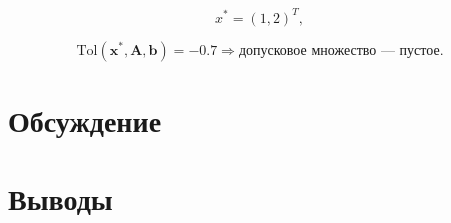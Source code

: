 \documentclass{article}
\begin{document}
\begin{enumerate}
      \[
        x^* = (1, 2)^T,
      \]

      \[
        \text{Tol}(\mathbf{x}^*, \mathbf{A}, \mathbf{b}) = -0.7 \Rightarrow \text{допусковое множество --- пустое}.
      \]
  \end{enumerate}

  \clearpage

  \section{Обсуждение}

  \section{Выводы}
\end{document}
